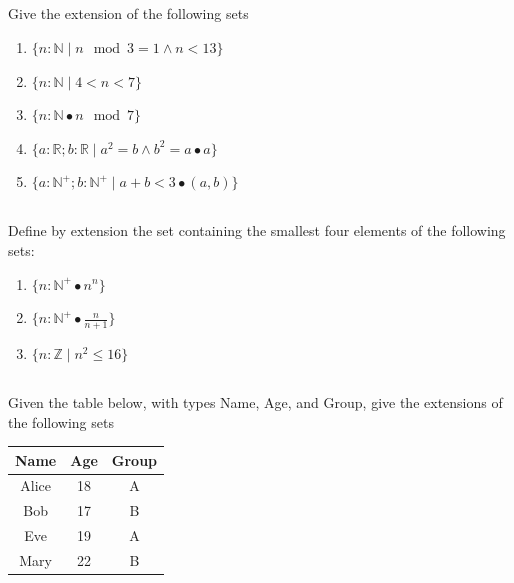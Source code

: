\documentclass[twocolumn]{article}
\begin{document}
\subsection{}

    Give the extension of the following sets

    \begin{enumerate}
        \item $\{ n : \mathbb{N} \mid n \mod 3 = 1 \wedge n < 13 \} $
        \item $\{ n : \mathbb{N} \mid 4 < n < 7 \} $
        \item $ \{ n : \mathbb{N} \bullet n \mod 7 \} $
        \item $\{ a : \mathbb{R}; b : \mathbb{R}  \mid a^2 = b \wedge b^2 = a \bullet a \} $
        \item $\{ a : \mathbb{N}^+; b : \mathbb{N}^+  \mid a + b < 3 \bullet (a, b) \} $
    \end{enumerate}


\subsection{}

    Define by extension the set containing the smallest four elements of the following sets:

    \begin{enumerate}
        \item $ \{ n : \mathbb{N}^+ \bullet n^n \} $
        \item $ \{ n : \mathbb{N}^+ \bullet \frac{n}{n+1} \} $
        \item $ \{ n : \mathbb{Z} \mid n^2 \leq 16  \} $
    \end{enumerate}

\subsection{}

    Given the table below, with types Name, Age, and Group, give the extensions of the following sets

    \begin{table}[h!]
        \centering
        \begin{tabular}{c | c | c }
            \toprule
            Name & Age & Group \\
            \midrule
            Alice & 18 & A  \\
            Bob & 17 & B  \\
            Eve & 19 & A \\
            Mary & 22 & B \\
            \bottomrule
        \end{tabular}
    \end{table}
\end{document}

